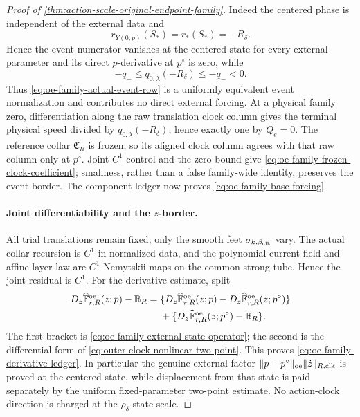 \begin{proof}[Proof of
\cref{thm:action-scale-original-endpoint-family}]
Indeed the centered phase is independent of the external data and
\[
 r_{Y(0;p)}(S_*)=r_*(S_*)=-R_\delta.
\]
Hence the event numerator vanishes at the centered state for every
external parameter and its direct \(p\)-derivative at \(p^\circ\) is zero,
while
\[
 -q_+\le q_{0,\lambda}(-R_\delta)\le-q_-<0.
\]
Thus \cref{eq:oe-family-actual-event-row} is a uniformly equivalent event
normalization and contributes no direct external forcing.  At a physical
family zero, differentiation along the raw translation clock column gives
the terminal physical speed divided by
\(q_{0,\lambda}(-R_\delta)\), hence exactly one by \(Q_e=0\).  The
reference collar \(\mathfrak C_R\) is frozen, so its aligned clock column
agrees with that raw column only at \(p^\circ\).  Joint \(C^1\) control and
the zero bound give
\cref{eq:oe-family-frozen-clock-coefficient}; smallness, rather than a
false family-wide identity, preserves the event border.  The component
ledger now proves \cref{eq:oe-family-base-forcing}.

\paragraph{Joint differentiability and the \(z\)-border.}
All trial translations remain fixed; only the smooth feet
\(\sigma_{k,\beta_{\rm clk}}\) vary.  The actual collar recursion is
\(C^1\) in normalized data, and the polynomial current field and affine
layer law are \(C^1\) Nemytskii maps on the common strong tube.  Hence the
joint residual is \(C^1\).  For the derivative estimate, split
\begin{align*}
 D_z\widehat{\mathbb F}_{r,R}^{\rm oe}(z;p)-\mathbb B_R
 ={}&\{D_z\widehat{\mathbb F}_{r,R}^{\rm oe}(z;p)
        -D_z\widehat{\mathbb F}_{r,R}^{\rm oe}(z;p^\circ)\}\\
 &+\{D_z\widehat{\mathbb F}_{r,R}^{\rm oe}(z;p^\circ)
        -\mathbb B_R\}.
\end{align*}
The first bracket is
\cref{eq:oe-family-external-state-operator}; the second is the
differential form of
\cref{eq:outer-clock-nonlinear-two-point}.  This proves
\cref{eq:oe-family-derivative-ledger}.  In particular the genuine
external factor
\(\|p-p^\circ\|_{\rm oe}\|\dot z\|_{R,\rm clk}\) is proved at the
centered state, while displacement from that state is paid separately by
the uniform fixed-parameter two-point estimate.  No action-clock direction
is charged at the \(\rho_\delta\) state scale.


\end{proof}
